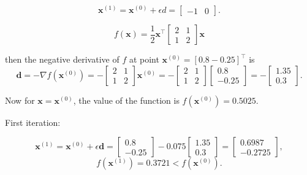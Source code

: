 \begin{equation*}
	\boldsymbol{x}^{(1)}=\boldsymbol{x}^{(0)}+\epsilon d=\left[\begin{array}{ll}
		-1 & 0
	\end{array}\right] .
\end{equation*}

\begin{equation*}
	f(\boldsymbol{x})=\frac{1}{2} \boldsymbol{x}^{\top}\left[\begin{array}{ll}
		2 & 1 \\
		1 & 2
	\end{array}\right] \boldsymbol{x}
\end{equation*}

then the negative derivative of \(f\) at point \(\boldsymbol{x}^{(0)}=[0.8-0.25]^{\top}\) is 
\[\boldsymbol{d}=-\nabla f\left(\boldsymbol{x}^{(0)}\right)=-\left[\begin{array}{ll}2 & 1 \\ 1 & 2\end{array}\right] \boldsymbol{x}^{(0)}=-\left[\begin{array}{ll}2 & 1 \\ 1 & 2\end{array}\right]\left[\begin{array}{c}0.8 \\ -0.25\end{array}\right]=-\left[\begin{array}{c}1.35 \\ 0.3\end{array}\right].\]

Now for \(\boldsymbol{x}=\boldsymbol{x}^{(0)}\), the value of the function is \(f\left(\boldsymbol{x}^{(0)}\right)=0.5025\).

First iteration:

\[\boldsymbol{x}^{(1)}=\boldsymbol{x}^{(0)}+\epsilon \boldsymbol{d}=\left[\begin{array}{c}0.8 \\ -0.25\end{array}\right]-0.075\left[\begin{array}{c}1.35 \\ 0.3\end{array}\right]=\left[\begin{array}{c}0.6987 \\ -0.2725\end{array}\right],\]
\[f\left(\boldsymbol{x}^{(1)}\right)=0.3721<f\left(\boldsymbol{x}^{(0)}\right).\]

